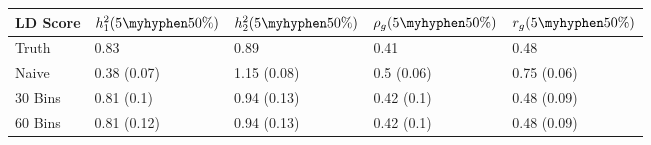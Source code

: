 \begin{table}[ht]
\centering
\begin{tabular}{lllll}
  \hline
LD Score & $h^2_1(5\myhyphen50\%)$ & $h^2_2(5\myhyphen50\%)$ & $\rho_g(5\myhyphen50\%)$ & $r_g(5\myhyphen50\%)$ \\ 
  \hline
Truth & 0.83 & 0.89 & 0.41 & 0.48 \\ 
  Naive & 0.38 (0.07) & 1.15 (0.08) & 0.5 (0.06) & 0.75 (0.06) \\ 
  30 Bins & 0.81 (0.1) & 0.94 (0.13) & 0.42 (0.1) & 0.48 (0.09) \\ 
  60 Bins & 0.81 (0.12) & 0.94 (0.13) & 0.42 (0.1) & 0.48 (0.09) \\ 
   \hline
\end{tabular}
\end{table}
